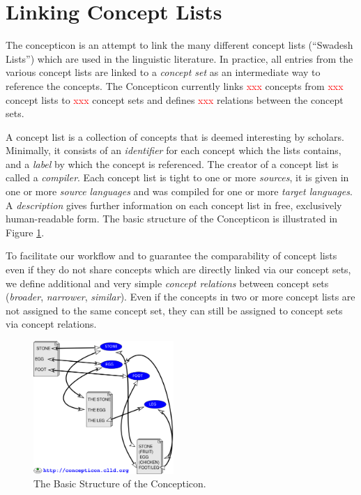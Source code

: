 \documentclass[10pt, a4paper]{article}
\newcommand{\conceptnumber}{\textcolor{red}{xxx} }
\newcommand{\listnumber}{\textcolor{red}{xxx} }
\newcommand{\setnumber}{\textcolor{red}{xxx} }
\newcommand{\relationnumber}{\textcolor{red}{xxx} }
\begin{document}
\section{Linking Concept Lists}
The concepticon is an attempt to link the many different concept lists (``Swadesh Lists'') which are
used in the linguistic literature. In practice, all entries from the various concept lists are
linked to a \emph{concept set} as an intermediate way to reference the concepts. The Concepticon
currently links \conceptnumber concepts from \listnumber concept lists to \setnumber concept sets
and defines \relationnumber relations between the concept sets.
 
A concept list is a collection of concepts that is deemed interesting by scholars. Minimally, it
consists of an \emph{identifier} for each concept which the lists contains, and a \emph{label} by
which the concept is referenced. The creator of a concept list is called a \emph{compiler}. Each
concept list is tight to one or more \emph{sources}, it is given in one or more \emph{source
languages} and was compiled for one or more \emph{target languages}. A \emph{description} gives
further information on each concept list in free, exclusively human-readable form. The basic
structure of the Concepticon is illustrated in Figure \ref{fig:concepticon}.
 
To facilitate our workflow and to guarantee the comparability of concept lists even if they do not
share concepts which are directly linked via our concept sets, we define additional and very simple
\emph{concept relations} between concept sets (\emph{broader}, \emph{narrower}, \emph{similar}).
Even if the concepts in two or more concept lists are not assigned to the same concept set, they can
still be assigned to concept sets via concept relations.

\begin{figure}[h]
  \includegraphics[width=0.475\textwidth]{img/concepticon_2.pdf}
  \caption{The Basic Structure of the Concepticon.}
  \label{fig:concepticon}
\end{figure}
\end{document}
